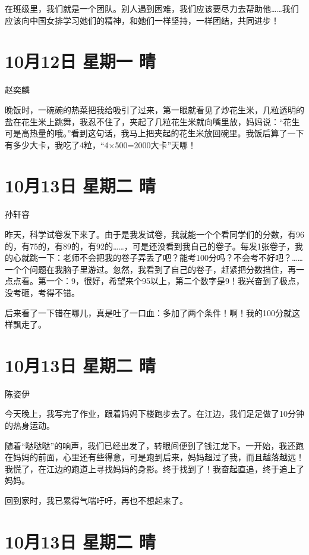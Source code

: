 在班级里，我们就是一个团队。别人遇到困难，我们应该要尽力去帮助他\ldots\ldots 我们应该向中国女排学习她们的精神，和她们一样坚持，一样团结，共同进步！

\section{10月12日 星期一 晴}

赵奕麟

晚饭时，一碗碗的热菜把我给吸引了过来，第一眼就看见了炒花生米，几粒透明的盐在花生米上跳舞，我忍不住了，夹起了几粒花生米就向嘴里放，妈妈说：``花生可是高热量的哦。''看到这句话，我马上把夹起的花生米放回碗里。我饭后算了一下有多少大卡，我吃了4粒，``4×500=2000大卡''天哪！

\section{10月13日 星期二 晴}

孙轩睿

昨天，科学试卷发下来了。由于是我发试卷，我就能一个个看同学们的分数，有96的，有75的，有89的，有92的\ldots\ldots，可是还没看到我自己的卷子。每发1张卷子，我的心就跳一下：老师不会把我的卷子弄丢了吧？能考100分吗？不会考不好吧？\ldots\ldots 一个个问题在我脑子里游过。忽然，我看到了自己的卷子，赶紧把分数挡住，再一点点看。第一个：9，很好，希望来个95以上，第二个数字是9！我兴奋到了极点，没考砸，考得不错。

后来看了一下错在哪儿，真是吐了一口血：多加了两个条件！啊！我的100分就这样飘走了。

\section{10月13日 星期二 晴}

陈姿伊

今天晚上，我写完了作业，跟着妈妈下楼跑步去了。在江边，我们足足做了10分钟的热身运动。

随着``哒哒哒''的响声，我们已经出发了，转眼间便到了钱江龙下。一开始，我还跑在妈妈的前面，心里还有些得意，可是跑到后来，妈妈超过了我，而且越落越远！我慌了，在江边的跑道上寻找妈妈的身影。终于找到了！我奋起直追，终于追上了妈妈。

回到家时，我已累得气喘吁吁，再也不想起来了。

\section{10月13日 星期二 晴}

